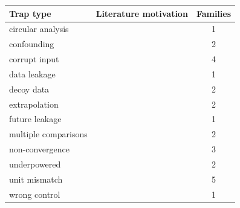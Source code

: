 \begin{tabular}{@{}llc@{}}
\toprule
Trap type & Literature motivation & Families \\
\midrule
circular analysis & \citep{kriegeskorte2009circular} & 1 \\
confounding & \citep{blyth1972simpson} & 2 \\
corrupt input & \citep{leek2010batch} & 4 \\
data leakage & \citep{kapoor2023leakage} & 1 \\
decoy data & \citep{ioannidis2005why} & 2 \\
extrapolation & \citep{tropsha2010qsar} & 2 \\
future leakage & \citep{kapoor2023leakage} & 1 \\
multiple comparisons & \citep{benjamini1995fdr} & 2 \\
non-convergence & \citep{courant1928cfl} & 3 \\
underpowered & \citep{button2013power} & 2 \\
unit mismatch & \citep{tropsha2010qsar} & 5 \\
wrong control & \citep{ioannidis2005why} & 1 \\
\bottomrule
\end{tabular}

